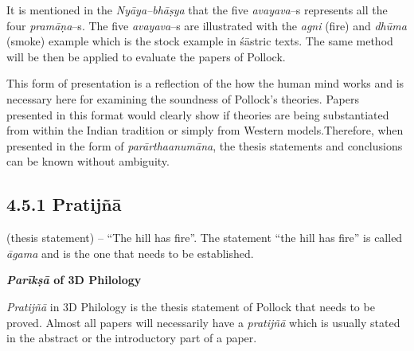 It is mentioned in the \textit{Nyāya–bhāṣya} that the five \textit{avayava}–s represents all the four \textit{pramāṇa}–s. The five \textit{avayava}–s are illustrated with the \textit{agni} (fire) and \textit{dhūma} (smoke) example which is the stock example in śāstric texts. The same method will be then be applied to evaluate the papers of Pollock.

This form of presentation is a reflection of the how the human mind works and is necessary here for examining the soundness of Pollock’s theories. Papers presented in this format would clearly show if theories are being substantiated from within the Indian tradition or simply from Western models.Therefore, when presented in the form of \textit{parārthaanumāna}, the thesis statements and conclusions can be known without ambiguity.

\subsection*{4.5.1 Pratijñā\protect{}}

(thesis statement) – “The hill has fire”. The statement “the hill has fire” is called \textit{āgama} and is the one that needs to be established.

\textbf{\textit{Parīkṣā} of 3D Philology}

\textit{Pratijñā} in 3D Philology is the thesis statement of Pollock that needs to be proved. Almost all papers will necessarily have a \textit{pratijñā }which is usually stated in the abstract or the introductory part of a paper.


